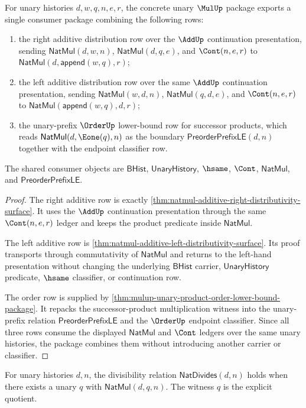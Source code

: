 \begin{theorem}
\label{thm:mulup-add-order-phase-interaction-package}
For unary histories $d,w,q,n,e,r$, the concrete unary $\MulUp$ package exports
a single consumer package combining the following rows:
\begin{enumerate}
\item the right additive distribution row over the $\AddUp$ continuation
presentation, sending $\mathsf{NatMul}(d,w,n)$, $\mathsf{NatMul}(d,q,e)$,
and $\Cont(n,e,r)$ to $\mathsf{NatMul}(d,\mathsf{append}(w,q),r)$;
\item the left additive distribution row over the same $\AddUp$ continuation
presentation, sending $\mathsf{NatMul}(w,d,n)$, $\mathsf{NatMul}(q,d,e)$,
and $\Cont(n,e,r)$ to $\mathsf{NatMul}(\mathsf{append}(w,q),d,r)$;
\item the unary-prefix $\OrderUp$ lower-bound row for successor products,
which reads $\mathsf{NatMul}(d,\Eone(q),n)$ as the boundary
$\mathsf{PreorderPrefixLE}(d,n)$ together with the endpoint classifier row.
\end{enumerate}
The shared consumer objects are $\mathsf{BHist}$, $\mathsf{UnaryHistory}$,
$\hsame$, $\Cont$, $\mathsf{NatMul}$, and $\mathsf{PreorderPrefixLE}$.
\end{theorem}
\begin{proof}
The right additive row is exactly
\autoref{thm:natmul-additive-right-distributivity-surface}. It uses the
$\AddUp$ continuation presentation through the same $\Cont(n,e,r)$ ledger and
keeps the product predicate inside $\mathsf{NatMul}$.

The left additive row is
\autoref{thm:natmul-additive-left-distributivity-surface}. Its proof transports
through commutativity of $\mathsf{NatMul}$ and returns to the left-hand
presentation without changing the underlying $\mathsf{BHist}$ carrier,
$\mathsf{UnaryHistory}$ predicate, $\hsame$ classifier, or continuation row.

The order row is supplied by
\autoref{thm:mulup-unary-product-order-lower-bound-package}. It repacks the
successor-product multiplication witness into the unary-prefix relation
$\mathsf{PreorderPrefixLE}$ and the $\OrderUp$ endpoint classifier. Since all
three rows consume the displayed $\mathsf{NatMul}$ and $\Cont$ ledgers over the
same unary histories, the package combines them without introducing another
carrier or classifier.
\end{proof}

\begin{definition}
\label{def:nat-divides}
For unary histories \(d, n\), the divisibility relation \(\mathsf{NatDivides}(d, n)\) holds when there exists a unary \(q\) with \(\mathsf{NatMul}(d, q, n)\). The witness \(q\) is the explicit quotient.
\end{definition}

